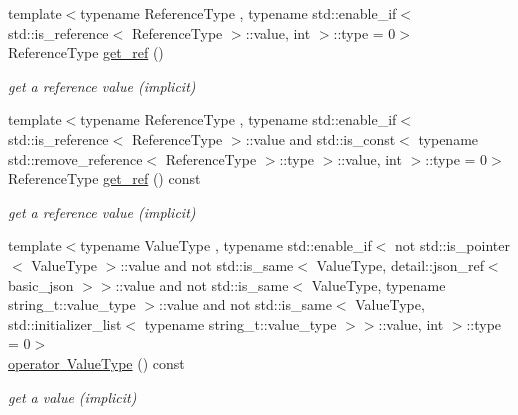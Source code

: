 \begin{DoxyCompactItemize}
{\footnotesize template$<$typename Reference\+Type , typename std\+::enable\+\_\+if$<$ std\+::is\+\_\+reference$<$ Reference\+Type $>$\+::value, int $>$\+::type  = 0$>$ }\\Reference\+Type \mbox{\hyperlink{classnlohmann_1_1basic__json_afbd800010b67619463c0fce6e74f7878}{get\+\_\+ref}} ()
\begin{DoxyCompactList}\small\item\em get a reference value (implicit) \end{DoxyCompactList}\item 
{\footnotesize template$<$typename Reference\+Type , typename std\+::enable\+\_\+if$<$ std\+::is\+\_\+reference$<$ Reference\+Type $>$\+::value and std\+::is\+\_\+const$<$ typename std\+::remove\+\_\+reference$<$ Reference\+Type $>$\+::type $>$\+::value, int $>$\+::type  = 0$>$ }\\Reference\+Type \mbox{\hyperlink{classnlohmann_1_1basic__json_ac382f3d2bc6a5d52d936e4e40593f03b}{get\+\_\+ref}} () const
\begin{DoxyCompactList}\small\item\em get a reference value (implicit) \end{DoxyCompactList}\item 
{\footnotesize template$<$typename Value\+Type , typename std\+::enable\+\_\+if$<$ not std\+::is\+\_\+pointer$<$ Value\+Type $>$\+::value and not std\+::is\+\_\+same$<$ Value\+Type, detail\+::json\+\_\+ref$<$ basic\+\_\+json $>$$>$\+::value and not std\+::is\+\_\+same$<$ Value\+Type, typename string\+\_\+t\+::value\+\_\+type $>$\+::value and not std\+::is\+\_\+same$<$ Value\+Type, std\+::initializer\+\_\+list$<$ typename string\+\_\+t\+::value\+\_\+type $>$$>$\+::value, int $>$\+::type  = 0$>$ }\\\mbox{\hyperlink{classnlohmann_1_1basic__json_a1f1d4bc973c5b866db3d96e14d2c9f3f}{operator Value\+Type}} () const
\begin{DoxyCompactList}\small\item\em get a value (implicit) \end{DoxyCompactList}\end{DoxyCompactItemize}
